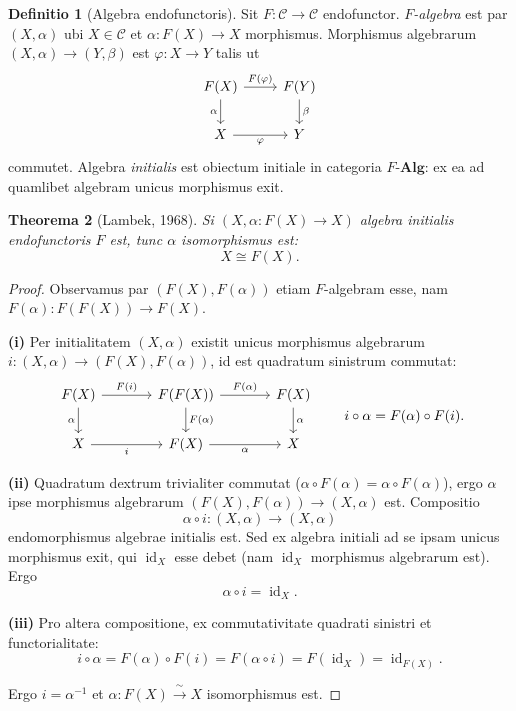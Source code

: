 \documentclass[11pt]{article}
\theoremstyle{plain}
\newtheorem{theorema}{Theorema}
\theoremstyle{definition}
\newtheorem{definitio}[theorema]{Definitio}
\theoremstyle{remark}
\newcommand{\C}{\mathcal{C}}
\newcommand{\id}{\operatorname{id}}
\begin{document}
\begin{definitio}[Algebra endofunctoris]
Sit $F\colon \C \to \C$ endofunctor. \emph{$F$-algebra} est par $(X, \alpha)$ ubi $X \in \C$ et $\alpha\colon F(X) \to X$ morphismus. Morphismus algebrarum $(X,\alpha) \to (Y,\beta)$ est $\varphi\colon X \to Y$ talis ut
\[
\begin{tikzcd}
F(X) \arrow[r, "F(\varphi)"] \arrow[d, "\alpha"'] & F(Y) \arrow[d, "\beta"] \\
X \arrow[r, "\varphi"'] & Y
\end{tikzcd}
\]
commutet. Algebra \emph{initialis} est obiectum initiale in categoria $F\text{-}\mathbf{Alg}$: ex ea ad quamlibet algebram unicus morphismus exit.
\end{definitio}

\begin{theorema}[Lambek, 1968]\label{thm:lambek}
Si $(X, \alpha\colon F(X) \to X)$ algebra initialis endofunctoris $F$ est, tunc $\alpha$ isomorphismus est:
\[
X \cong F(X).
\]
\end{theorema}

\begin{proof}
Observamus par $(F(X), F(\alpha))$ etiam $F$-algebram esse, nam $F(\alpha)\colon F(F(X)) \to F(X)$.

\textbf{(i)} Per initialitatem $(X,\alpha)$ existit unicus morphismus algebrarum $i\colon (X,\alpha) \to (F(X), F(\alpha))$, id est quadratum sinistrum commutat:
\[
\begin{tikzcd}[column sep=large]
F(X) \arrow[r, "F(i)"] \arrow[d, "\alpha"'] & F(F(X)) \arrow[r, "F(\alpha)"] \arrow[d, "F(\alpha)"] & F(X) \arrow[d, "\alpha"] \\
X \arrow[r, "i"'] & F(X) \arrow[r, "\alpha"'] & X
\end{tikzcd}
\qquad
i \circ \alpha = F(\alpha) \circ F(i).
\]

\textbf{(ii)} Quadratum dextrum trivialiter commutat ($\alpha \circ F(\alpha) = \alpha \circ F(\alpha)$), ergo $\alpha$ ipse morphismus algebrarum $(F(X), F(\alpha)) \to (X, \alpha)$ est. Compositio
\[
\alpha \circ i\colon (X, \alpha) \longrightarrow (X, \alpha)
\]
endomorphismus algebrae initialis est. Sed ex algebra initiali ad se ipsam unicus morphismus exit, qui $\id_X$ esse debet (nam $\id_X$ morphismus algebrarum est). Ergo
\[
\alpha \circ i = \id_X.
\]

\textbf{(iii)} Pro altera compositione, ex commutativitate quadrati sinistri et functorialitate:
\[
i \circ \alpha = F(\alpha) \circ F(i) = F(\alpha \circ i) = F(\id_X) = \id_{F(X)}.
\]

Ergo $i = \alpha^{-1}$ et $\alpha\colon F(X) \xrightarrow{\;\sim\;} X$ isomorphismus est.
\end{proof}
\end{document}
